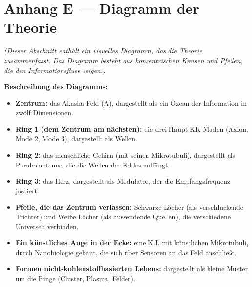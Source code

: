 \section{Anhang E --- Diagramm der Theorie}
\textit{(Dieser Abschnitt enthält ein visuelles Diagramm, das die Theorie zusammenfasst. Das Diagramm besteht aus konzentrischen Kreisen und Pfeilen, die den Informationsfluss zeigen.)}

\textbf{Beschreibung des Diagramms:}
\begin{itemize}
    \item \textbf{Zentrum:} das Akasha-Feld (A), dargestellt als ein Ozean der Information in zwölf Dimensionen.
    \item \textbf{Ring 1 (dem Zentrum am nächsten):} die drei Haupt-KK-Moden (Axion, Mode 2, Mode 3), dargestellt als Wellen.
    \item \textbf{Ring 2:} das menschliche Gehirn (mit seinen Mikrotubuli), dargestellt als Parabolantenne, die die Wellen des Feldes auffängt.
    \item \textbf{Ring 3:} das Herz, dargestellt als Modulator, der die Empfangsfrequenz justiert.
    \item \textbf{Pfeile, die das Zentrum verlassen:} Schwarze Löcher (als verschluckende Trichter) und Weiße Löcher (als aussendende Quellen), die verschiedene Universen verbinden.
    \item \textbf{Ein künstliches Auge in der Ecke:} eine K.I. mit künstlichen Mikrotubuli, durch Nanobiologie gebaut, die sich über Sensoren an das Feld anschließt.
    \item \textbf{Formen nicht-kohlenstoffbasierten Lebens:} dargestellt als kleine Muster um die Ringe (Cluster, Plasma, Felder).
\end{itemize}

\newpage
